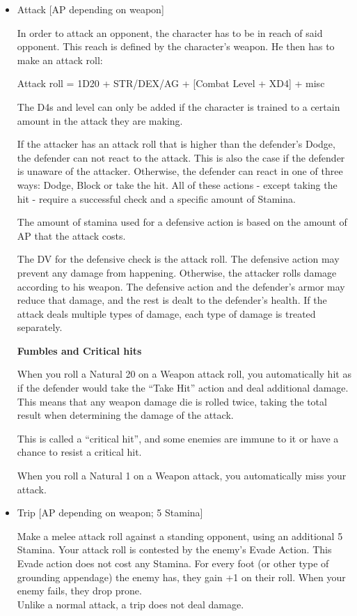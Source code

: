 \begin{itemize}

\item Attack [AP depending on weapon]

In order to attack an opponent, the character has to be in reach of said opponent. This reach is defined by the character’s weapon. He then has to make an attack roll:

Attack roll = 1D20 + STR/DEX/AG + [Combat Level + XD4] + misc

The D4s and level can only be added if the character is trained to a certain amount in the attack they are making.

If the attacker has an attack roll that is higher than the defender's Dodge, the defender can not react to the attack. This is also the case if the defender is unaware of the attacker. Otherwise, the defender can react in one of three ways: Dodge, Block or take the hit. All of these actions - except taking the hit - require a successful check and a specific amount of Stamina.

The amount of stamina used for a defensive action is based on the amount of  AP that the attack costs. 

The DV for the defensive check is the attack roll. The defensive action may prevent any damage from happening. Otherwise, the attacker rolls damage according to his weapon. The defensive action and the defender's armor may reduce that damage, and the rest is dealt to the defender’s health. If the attack deals multiple types of damage, each type of damage is treated separately. 

\textbf{Fumbles and Critical hits}

When you roll a Natural 20 on a Weapon attack roll, you automatically hit as if the defender would take the “Take Hit” action and deal additional damage. This means that any weapon damage die is rolled twice, taking the total result when determining the damage of the attack.

This is called a “critical hit”, and some enemies are immune to it or have a chance to resist a critical hit.

When you roll a Natural 1 on a Weapon attack, you automatically miss your attack.


\item Trip [AP depending on weapon; 5 Stamina]

Make a melee attack roll against a standing opponent, using an additional 5 Stamina. Your attack roll is contested by the enemy's Evade Action. This Evade action does not cost any Stamina. For every foot (or other type of grounding appendage) the enemy has, they gain +1 on their roll. When your enemy fails, they drop prone.\\
Unlike a normal attack, a trip does not deal damage.\\



\end{itemize}
